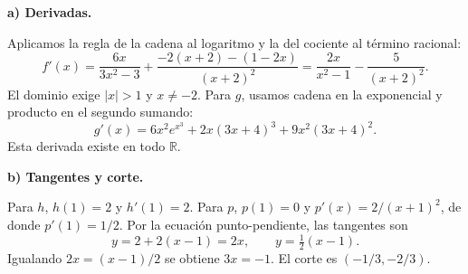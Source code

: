 \textbf{a) Derivadas.}\par\nopagebreak[4]
Aplicamos la regla de la cadena al logaritmo y la del cociente al término racional:
\[
f'(x)=\frac{6x}{3x^2-3}+
\frac{-2(x+2)-(1-2x)}{(x+2)^2}
=\boxed{\frac{2x}{x^2-1}-\frac5{(x+2)^2}}.
\]
El dominio exige $|x|>1$ y $x\ne-2$. Para $g$, usamos cadena en la exponencial y producto en el segundo sumando:
\[
\boxed{g'(x)=6x^2e^{x^3}+2x(3x+4)^3+9x^2(3x+4)^2.}
\]
Esta derivada existe en todo $\mathbb R$.

\textbf{b) Tangentes y corte.}\par\nopagebreak[4]
Para $h$, $h(1)=2$ y $h'(1)=2$. Para $p$, $p(1)=0$ y $p'(x)=2/(x+1)^2$, de donde $p'(1)=1/2$. Por la ecuación punto-pendiente, las tangentes son
\[
\boxed{y=2+2(x-1)=2x},\qquad \boxed{y=\tfrac12(x-1)}.
\]
Igualando $2x=(x-1)/2$ se obtiene $3x=-1$. El corte es $\boxed{(-1/3,-2/3)}$.
